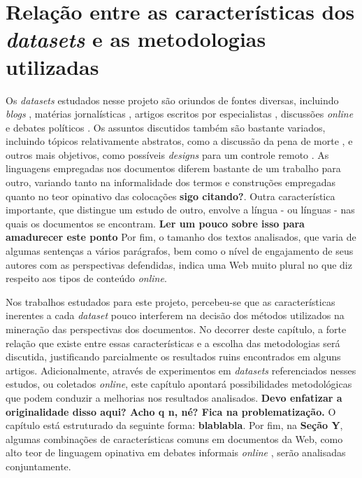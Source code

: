 \chapter{Relação entre as características dos \emph{datasets} e as metodologias utilizadas}
\label{cap:caracsdatasets}

Os \emph{datasets} estudados nesse projeto são oriundos de fontes diversas, incluindo \emph{blogs} \cite{jiang-argamon} \cite{durant-smith}, matérias jornalísticas \cite{grefenstette-et-al} \cite{schimmelfing-baldwin}, artigos escritos por especialistas \cite{lin-et-al2006} \cite{efrom}, discussões \emph{online} \cite{somasundaran} \cite{wiebe08} e debates políticos \cite{hirst-et-al} \cite{thomas-pang-lee}. Os assuntos discutidos também são bastante variados, incluindo tópicos relativamente abstratos, como a discussão da pena de morte \cite{greeneTESE}, e outros mais objetivos, como possíveis \emph{designs} para um controle remoto \cite{somasundaranGRAPH} \cite{wiebe08}. As linguagens empregadas nos documentos diferem bastante de um trabalho para outro, variando tanto na informalidade dos termos e construções empregadas quanto no teor opinativo das colocações \textbf{sigo citando?}. Outra característica importante, que distingue um estudo de outro, envolve a língua - ou línguas - nas quais os documentos se encontram. \textbf{Ler um pouco sobre isso para amadurecer este ponto} Por fim, o tamanho dos textos analisados, que varia de algumas sentenças a vários parágrafos, bem como o nível de engajamento de seus autores com as perspectivas defendidas, indica uma Web muito plural no que diz respeito aos tipos de conteúdo \emph{online}. 

Nos trabalhos estudados para este projeto, percebeu-se que as características inerentes a cada \emph{dataset} pouco interferem na decisão dos métodos utilizados na mineração das perspectivas dos documentos. No decorrer deste capítulo, a forte relação que existe entre essas características e a escolha das metodologias será discutida, justificando parcialmente os resultados ruins encontrados em alguns artigos. Adicionalmente, através de experimentos em \emph{datasets} referenciados nesses estudos, ou coletados \emph{online}, este capítulo apontará possibilidades metodológicas que podem conduzir a melhorias nos resultados analisados. \textbf{Devo enfatizar a originalidade disso aqui? Acho q n, né? Fica na problematização.} O capítulo está estruturado da seguinte forma: \textbf{blablabla}. Por fim, na \textbf{Seção Y}, algumas combinações de características comuns em documentos da Web, como alto teor de linguagem opinativa em debates informais \emph{online} \cite{somasundaran}, serão analisadas conjuntamente.

